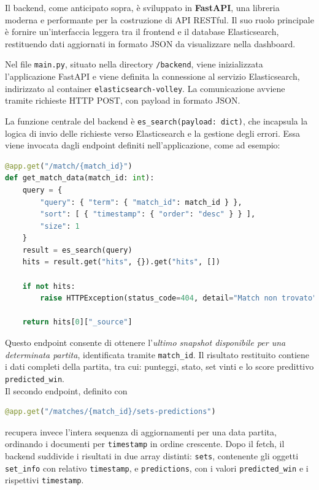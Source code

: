 \documentclass[a4paper,12pt]{report}
\begin{document}
Il backend, come anticipato sopra, è sviluppato in \textbf{FastAPI}, una libreria moderna e performante per la costruzione di API RESTful. Il suo ruolo principale è fornire un’interfaccia leggera tra il frontend e il database Elasticsearch, restituendo dati aggiornati in formato JSON da visualizzare nella dashboard.

Nel file \texttt{main.py}, situato nella directory \texttt{/backend}, viene inizializzata l’applicazione FastAPI e viene definita la connessione al servizio Elasticsearch, indirizzato al container \texttt{elasticsearch-volley}. La comunicazione avviene tramite richieste HTTP POST, con payload in formato JSON.

La funzione centrale del backend è \texttt{es\_search(payload: dict)}, che incapsula la logica di invio delle richieste verso Elasticsearch e la gestione degli errori. Essa viene invocata dagli endpoint definiti nell’applicazione, come ad esempio:

\begin{lstlisting}[language=Python]
@app.get("/match/{match_id}")
def get_match_data(match_id: int):
    query = {
        "query": { "term": { "match_id": match_id } },
        "sort": [ { "timestamp": { "order": "desc" } } ],
        "size": 1
    }
    result = es_search(query)
    hits = result.get("hits", {}).get("hits", [])

    if not hits:
        raise HTTPException(status_code=404, detail="Match non trovato")

    return hits[0]["_source"]
\end{lstlisting}

Questo endpoint consente di ottenere l’\textit{ultimo snapshot disponibile per una determinata partita}, identificata tramite \texttt{match\_id}. Il risultato restituito contiene i dati completi della partita, tra cui: punteggi, stato, set vinti e lo score predittivo \texttt{predicted\_win}.
\\

Il secondo endpoint, definito con

\begin{lstlisting}[language=Python]
@app.get("/matches/{match_id}/sets-predictions")
\end{lstlisting}

recupera invece l’intera sequenza di aggiornamenti per una data partita, ordinando i documenti per \texttt{timestamp} in ordine crescente. Dopo il fetch, il backend suddivide i risultati in due array distinti: \texttt{sets}, contenente gli oggetti \texttt{set\_info} con relativo \texttt{timestamp}, e \texttt{predictions}, con i valori \texttt{predicted\_win} e i rispettivi \texttt{timestamp}.
\end{document}
